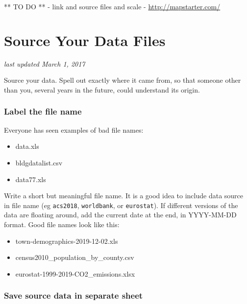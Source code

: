 \documentclass[
  english,
]{book}
\providecommand{\tightlist}{%
  \setlength{\itemsep}{0pt}\setlength{\parskip}{0pt}}
\begin{document}
** TO DO **
- link and source files and scale
- \url{http://mapstarter.com/}

\hypertarget{source}{%
\section{Source Your Data Files}\label{source}}

\emph{last updated March 1, 2017}

Source your data. Spell out exactly where it came from, so that someone other than you, several years in the future, could understand its origin.

\hypertarget{label-the-file-name}{%
\subsubsection*{Label the file name}\label{label-the-file-name}}

Everyone has seen examples of bad file names:

\begin{itemize}
\tightlist
\item
  data.xls
\item
  bldgdatalist.csv
\item
  data77.xls
\end{itemize}

Write a short but meaningful file name. It is a good idea to include data source in file name (eg \texttt{acs2018}, \texttt{worldbank}, or \texttt{eurostat}). If different versions of the data are floating around, add the current date at the end, in YYYY-MM-DD format. Good file names look like this:

\begin{itemize}
\tightlist
\item
  town-demographics-2019-12-02.xls
\item
  census2010\_population\_by\_county.csv
\item
  eurostat-1999-2019-CO2\_emissions.xlsx
\end{itemize}

\hypertarget{save-source-data-in-separate-sheet}{%
\subsubsection*{Save source data in separate sheet}\label{save-source-data-in-separate-sheet}}
\end{document}
